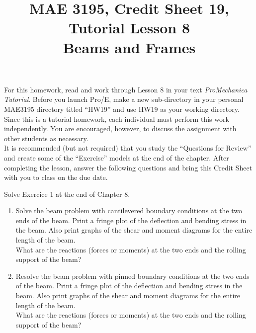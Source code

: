 \documentclass[12pt]{article}
\title{MAE 3195, Credit Sheet 19, Tutorial Lesson 8\\
Beams and Frames}
\date{}
\begin{document}
\maketitle

For this homework, read and work through Lesson 8 in your text \textit{ProMechanica Tutorial}. Before you launch Pro/E, make a new sub-directory in your personal MAE3195 directory titled ``HW19'' and use HW19 as your working directory.\\

Since this is a tutorial homework, each individual must perform this work independently. You are encouraged, however, to discuss the assignment with other students as necessary.\\

It is recommended (but not required) that you study the ``Questions for Review'' and create some of the ``Exercise'' models at the end of the chapter. After completing the lesson, answer the following questions and bring this Credit Sheet with you to class on the due date.

\pagebreak

Solve Exercice 1 at the end of Chapter 8.

\begin{enumerate}
	\item Solve the beam problem with cantilevered boundary conditions at the two ends of the beam. Print a fringe plot of the deflection and bending stress in the beam. Also print graphs of the shear and moment diagrams for the entire length of the beam.\\
What are the reactions (forces or moments) at the two ends and the rolling support of the beam?
	\vspace{2.5in}
	
	\item Resolve the beam problem with pinned boundary conditions at the two ends of the beam. Print a fringe plot of the deflection and bending stress in the beam. Also print graphs of the shear and moment diagrams for the entire length of the beam.\\
What are the reactions (forces or moments) at the two ends and the rolling support of the beam?

\end{enumerate}
\end{document}
